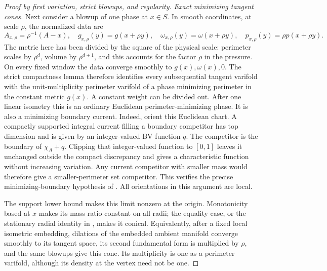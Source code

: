 \begin{proof}[Proof by first variation, strict blowups, and regularity]
\emph{Exact minimizing tangent cones.}
Next consider a blowup of one phase at $x\in S$.  In smooth coordinates,
at scale $\rho$, the normalized data are
\[
 A_{x,\rho}=\rho^{-1}(A-x),\quad
 g_{x,\rho}(y)=g(x+\rho y),\quad
 \omega_{x,\rho}(y)=\omega(x+\rho y),\quad
 p_{x,\rho}(y)=\rho p(x+\rho y).
\]
The metric here has been divided by the square of the physical scale:
perimeter scales by $\rho^d$, volume by $\rho^{d+1}$, and this accounts
for the factor $\rho$ in the pressure.  On every fixed window the data
converge smoothly to $g(x),\omega(x),0$.  The strict compactness lemma
therefore identifies every subsequential tangent varifold with the
unit-multiplicity perimeter varifold of a phase minimizing perimeter
in the constant metric $g(x)$.  A constant weight can be divided out.
After one linear isometry this is an ordinary Euclidean
perimeter-minimizing phase.  It is also a minimizing boundary current.
Indeed, orient this Euclidean chart.  A compactly supported integral
current filling a boundary competitor has top dimension and is given
by an integer-valued BV function $q$.  The competitor is the boundary
of $\chi_A+q$.  Clipping that integer-valued function to $[0,1]$ leaves
it unchanged outside the compact discrepancy and gives a characteristic
function without increasing variation.  Any current competitor with
smaller mass would therefore give a smaller-perimeter set competitor.
This verifies the precise minimizing-boundary hypothesis of
\citet[Chapter~7, Theorem~5.8]{simonGMT}.  All orientations in this
argument are local.

The support lower bound makes this limit nonzero at the origin.
Monotonicity based at $x$ makes its mass ratio constant on all radii;
the equality case, or the stationary radial identity in
\citet[Chapter~4, Equation~(3.6)]{simonGMT}, makes it conical.
Equivalently, after a fixed local isometric embedding, dilations of
the embedded ambient manifold converge smoothly to its tangent
space, its second fundamental form is multiplied by $\rho$, and
the same blowups give this cone.  Its multiplicity is one as a
perimeter varifold, although its density at the vertex need not
be one.


\end{proof}
